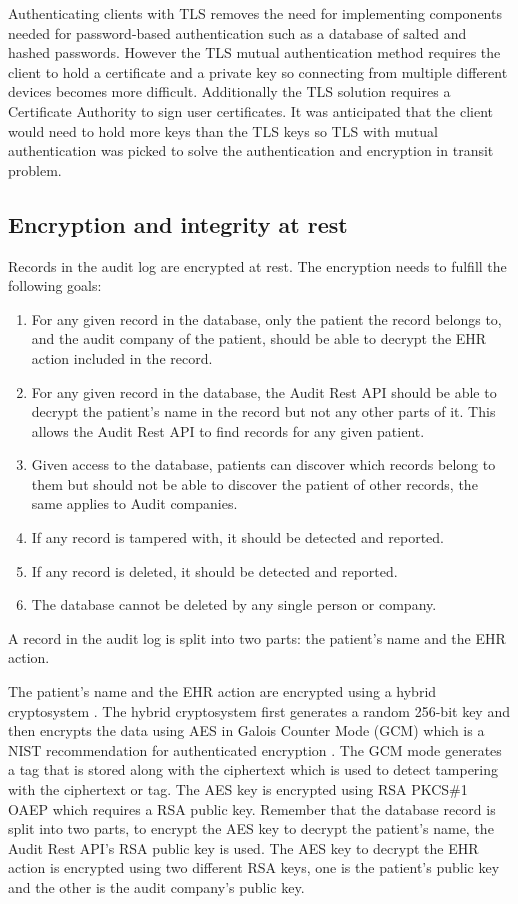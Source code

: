 \documentclass[11pt]{article}
\begin{document}
\begin{flushleft}
Authenticating clients with TLS removes the need for implementing components needed for password-based authentication such as a database of salted and hashed passwords. However the TLS mutual authentication method requires the client to hold a certificate and a private key so connecting from multiple different devices becomes more difficult. Additionally the TLS solution requires a Certificate Authority to sign user certificates. It was anticipated that the client would need to hold more keys than the TLS keys so TLS with mutual authentication was picked to solve the authentication and encryption in transit problem.

\subsection{Encryption and integrity at rest}

Records in the audit log are encrypted at rest. The encryption needs to fulfill the following goals:

\begin{enumerate}
	\item For any given record in the database, only the patient the record belongs to, and the audit company of the patient, should be able to decrypt the EHR action included in the record.
	\item For any given record in the database, the Audit Rest API should be able to decrypt the patient's name in the record but not any other parts of it. This allows the Audit Rest API to find records for any given patient.
	\item Given access to the database, patients can discover which records belong to them but should not be able to discover the patient of other records, the same applies to Audit companies.
	\item If any record is tampered with, it should be detected and reported.
	\item If any record is deleted, it should be detected and reported.
	\item The database cannot be deleted by any single person or company.
\end{enumerate}

A record in the audit log is split into two parts: the patient's name and the EHR action.

The patient's name and the EHR action are encrypted using a hybrid cryptosystem \cite{TODO: add cite about what it is?}. The hybrid cryptosystem first generates a random 256-bit key and then encrypts the data using AES in Galois Counter Mode (GCM) which is a NIST recommendation for authenticated encryption \cite{TODO: add citation}. The GCM mode generates a tag that is stored along with the ciphertext which is used to detect tampering with the ciphertext or tag. The AES key is encrypted using RSA PKCS\#1 OAEP which requires a RSA public key. Remember that the database record is split into two parts, to encrypt the AES key to decrypt the patient's name, the Audit Rest API's RSA public key is used. The AES key to decrypt the EHR action is encrypted using two different RSA keys, one is the patient's public key and the other is the audit company's public key.


\end{flushleft}
\end{document}
